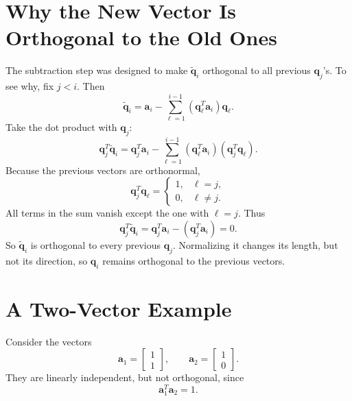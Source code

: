\section{Why the New Vector Is Orthogonal to the Old Ones}
\label{mf:gram-schmidt-orthogonality-check}

The subtraction step was designed to make \(\widetilde{\mathbf{q}}_i\) orthogonal to all previous \(\mathbf{q}_j\)'s. To see why, fix \(j<i\). Then
\[
    \widetilde{\mathbf{q}}_i
    =
    \mathbf{a}_i
    -
    \sum_{\ell=1}^{i-1}(\mathbf{q}_\ell^T\mathbf{a}_i)\mathbf{q}_\ell.
\]
Take the dot product with \(\mathbf{q}_j\):
\[
    \mathbf{q}_j^T\widetilde{\mathbf{q}}_i
    =
    \mathbf{q}_j^T\mathbf{a}_i
    -
    \sum_{\ell=1}^{i-1}(\mathbf{q}_\ell^T\mathbf{a}_i)(\mathbf{q}_j^T\mathbf{q}_\ell).
\]
Because the previous vectors are orthonormal,
\[
    \mathbf{q}_j^T\mathbf{q}_\ell
    =
    \begin{cases}
        1, & \ell=j,\\
        0, & \ell\neq j.
    \end{cases}
\]
All terms in the sum vanish except the one with \(\ell=j\). Thus
\[
    \mathbf{q}_j^T\widetilde{\mathbf{q}}_i
    =
    \mathbf{q}_j^T\mathbf{a}_i
    -
    (\mathbf{q}_j^T\mathbf{a}_i)
    =0.
\]
So \(\widetilde{\mathbf{q}}_i\) is orthogonal to every previous \(\mathbf{q}_j\). Normalizing it changes its length, but not its direction, so \(\mathbf{q}_i\) remains orthogonal to the previous vectors.

\section{A Two-Vector Example}
\label{mf:gram-schmidt-example-two-vectors}

Consider the vectors
\[
    \mathbf{a}_1=\begin{bmatrix}1\\1\end{bmatrix},
    \qquad
    \mathbf{a}_2=\begin{bmatrix}1\\0\end{bmatrix}.
\]
They are linearly independent, but not orthogonal, since
\[
    \mathbf{a}_1^T\mathbf{a}_2=1.
\]

